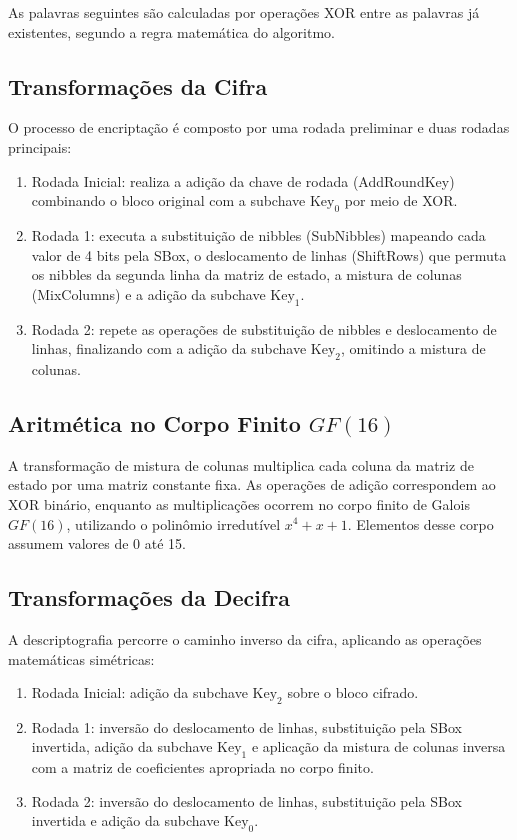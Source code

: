 \documentclass[12pt,a4paper]{article}
\begin{document}
As palavras seguintes são calculadas por operações XOR entre as palavras já existentes, segundo a regra matemática do algoritmo.

\subsection{Transformações da Cifra}

O processo de encriptação é composto por uma rodada preliminar e duas rodadas principais:

\begin{enumerate}
    \item Rodada Inicial: realiza a adição da chave de rodada (AddRoundKey) combinando o bloco original com a subchave $\text{Key}_0$ por meio de XOR.
    \item Rodada 1: executa a substituição de nibbles (SubNibbles) mapeando cada valor de 4 bits pela SBox, o deslocamento de linhas (ShiftRows) que permuta os nibbles da segunda linha da matriz de estado, a mistura de colunas (MixColumns) e a adição da subchave $\text{Key}_1$.
    \item Rodada 2: repete as operações de substituição de nibbles e deslocamento de linhas, finalizando com a adição da subchave $\text{Key}_2$, omitindo a mistura de colunas.
\end{enumerate}

\subsection{Aritmética no Corpo Finito \texorpdfstring{$GF(16)$}{GF(16)}}

A transformação de mistura de colunas multiplica cada coluna da matriz de estado por uma matriz constante fixa. As operações de adição correspondem ao XOR binário, enquanto as multiplicações ocorrem no corpo finito de Galois $GF(16)$, utilizando o polinômio irredutível $x^4 + x + 1$. Elementos desse corpo assumem valores de 0 até 15.

\subsection{Transformações da Decifra}

A descriptografia percorre o caminho inverso da cifra, aplicando as operações matemáticas simétricas:

\begin{enumerate}
    \item Rodada Inicial: adição da subchave $\text{Key}_2$ sobre o bloco cifrado.
    \item Rodada 1: inversão do deslocamento de linhas, substituição pela SBox invertida, adição da subchave $\text{Key}_1$ e aplicação da mistura de colunas inversa com a matriz de coeficientes apropriada no corpo finito.
    \item Rodada 2: inversão do deslocamento de linhas, substituição pela SBox invertida e adição da subchave $\text{Key}_0$.
\end{enumerate}
\end{document}

